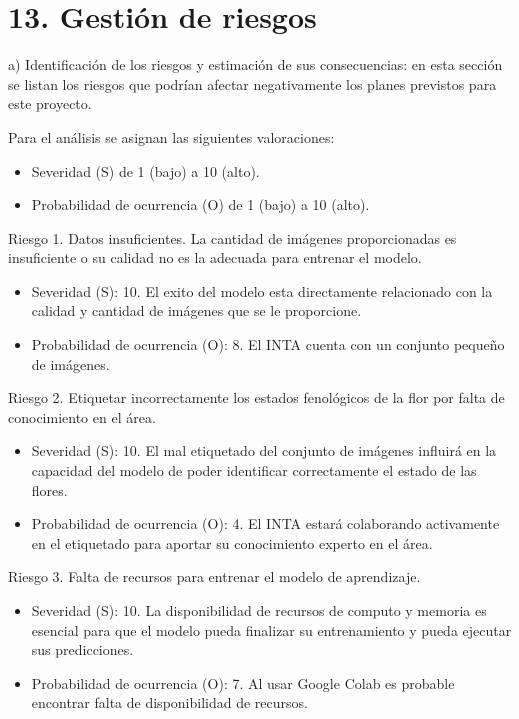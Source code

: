 \documentclass[
11pt, %
]{charter}
\begin{document}
\section{13. Gestión de riesgos}
\label{sec:riesgos}

a) Identificación de los riesgos y estimación de sus consecuencias: en esta sección se listan los riesgos que podrían afectar negativamente los planes previstos para este proyecto.

Para el análisis se asignan las siguientes valoraciones:

\begin{itemize}
\item Severidad (S) de 1 (bajo) a 10 (alto).
\item Probabilidad de ocurrencia (O) de 1 (bajo) a 10 (alto).
\end{itemize}

Riesgo 1. Datos insuficientes. La cantidad de imágenes proporcionadas es insuficiente o su calidad no es la adecuada para entrenar el modelo.

\begin{itemize}
\item Severidad (S): 10. El exito del modelo esta directamente relacionado con la calidad y cantidad de imágenes que se le proporcione. 

\item Probabilidad de ocurrencia (O): 8. El INTA cuenta con un conjunto pequeño de imágenes. 
\end{itemize}

Riesgo 2. Etiquetar incorrectamente los estados fenológicos de la flor por falta de conocimiento en el área.

\begin{itemize}
\item Severidad (S): 10. El mal etiquetado del conjunto de imágenes influirá en la capacidad del modelo de poder identificar correctamente el estado de las flores. 

\item Probabilidad de ocurrencia (O): 4. El INTA estará colaborando activamente en el etiquetado para aportar su conocimiento experto en el área. 
\end{itemize}

Riesgo 3. Falta de recursos para entrenar el modelo de aprendizaje.

\begin{itemize}
\item Severidad (S): 10. La disponibilidad de recursos de computo y memoria es esencial para que el modelo pueda finalizar su entrenamiento y pueda ejecutar sus predicciones. 

\item Probabilidad de ocurrencia (O): 7. Al usar Google Colab es probable encontrar falta de disponibilidad de recursos. 
\end{itemize}
\end{document}
